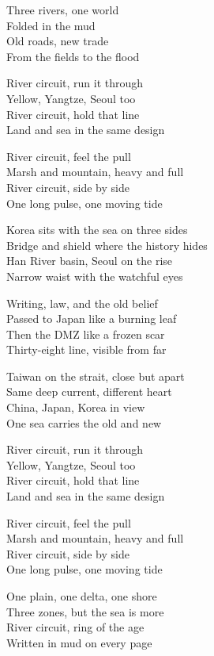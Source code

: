 \begin{lyrics}
Three rivers, one world\\
Folded in the mud\\
Old roads, new trade\\
From the fields to the flood

River circuit, run it through\\
Yellow, Yangtze, Seoul too\\
River circuit, hold that line\\
Land and sea in the same design

River circuit, feel the pull\\
Marsh and mountain, heavy and full\\
River circuit, side by side\\
One long pulse, one moving tide

Korea sits with the sea on three sides\\
Bridge and shield where the history hides\\
Han River basin, Seoul on the rise\\
Narrow waist with the watchful eyes

Writing, law, and the old belief\\
Passed to Japan like a burning leaf\\
Then the DMZ like a frozen scar\\
Thirty-eight line, visible from far

Taiwan on the strait, close but apart\\
Same deep current, different heart\\
China, Japan, Korea in view\\
One sea carries the old and new

River circuit, run it through\\
Yellow, Yangtze, Seoul too\\
River circuit, hold that line\\
Land and sea in the same design

River circuit, feel the pull\\
Marsh and mountain, heavy and full\\
River circuit, side by side\\
One long pulse, one moving tide

One plain, one delta, one shore\\
Three zones, but the sea is more\\
River circuit, ring of the age\\
Written in mud on every page
\end{lyrics}

